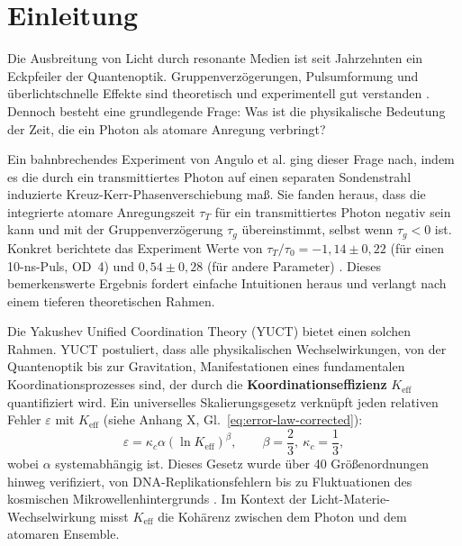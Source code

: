 \documentclass[12pt,a4paper]{article}
\newcommand{\Keff}{K_{\mathrm{eff}}}
\newcommand{\kappac}{\kappa_c}
\newcommand{\eps}{\varepsilon}
\newcommand{\betac}{\beta}
\begin{document}
	\newpage
	\tableofcontents
	\newpage
	
	\section{Einleitung}
	
	Die Ausbreitung von Licht durch resonante Medien ist seit Jahrzehnten ein Eckpfeiler der Quantenoptik. Gruppenverzögerungen, Pulsumformung und überlichtschnelle Effekte sind theoretisch und experimentell gut verstanden \cite{Brillouin1960, Milonni2004}. Dennoch besteht eine grundlegende Frage: Was ist die physikalische Bedeutung der Zeit, die ein Photon als atomare Anregung verbringt?
	
	Ein bahnbrechendes Experiment von Angulo et al. \cite{Angulo2024} ging dieser Frage nach, indem es die durch ein transmittiertes Photon auf einen separaten Sondenstrahl induzierte Kreuz-Kerr-Phasenverschiebung maß. Sie fanden heraus, dass die integrierte atomare Anregungszeit \(\tau_T\) für ein transmittiertes Photon negativ sein kann und mit der Gruppenverzögerung \(\tau_g\) übereinstimmt, selbst wenn \(\tau_g < 0\) ist. Konkret berichtete das Experiment Werte von \(\tau_T/\tau_0 = -1,14 \pm 0,22\) (für einen 10-ns-Puls, OD~4) und \(0,54 \pm 0,28\) (für andere Parameter) \cite{Angulo2024, Nixon2024}. Dieses bemerkenswerte Ergebnis fordert einfache Intuitionen heraus und verlangt nach einem tieferen theoretischen Rahmen.
	
	Die Yakushev Unified Coordination Theory (YUCT) \cite{Yakushev2026a} bietet einen solchen Rahmen. YUCT postuliert, dass alle physikalischen Wechselwirkungen, von der Quantenoptik bis zur Gravitation, Manifestationen eines fundamentalen Koordinationsprozesses sind, der durch die \textbf{Koordinationseffizienz} \(\Keff\) quantifiziert wird. Ein universelles Skalierungsgesetz verknüpft jeden relativen Fehler \(\eps\) mit \(\Keff\) (siehe Anhang X, Gl.~\ref{eq:error-law-corrected}):
	\begin{equation}
		\eps = \kappac \alpha (\ln\Keff)^{\betac}, \qquad \betac = \frac{2}{3},\ \kappac = \frac{1}{3},
		\label{eq:scaling}
	\end{equation}
	wobei \(\alpha\) systemabhängig ist. Dieses Gesetz wurde über 40 Größenordnungen hinweg verifiziert, von DNA-Replikationsfehlern bis zu Fluktuationen des kosmischen Mikrowellenhintergrunds \cite{Yakushev2026c}. Im Kontext der Licht-Materie-Wechselwirkung misst \(\Keff\) die Kohärenz zwischen dem Photon und dem atomaren Ensemble.
	
\end{document}
